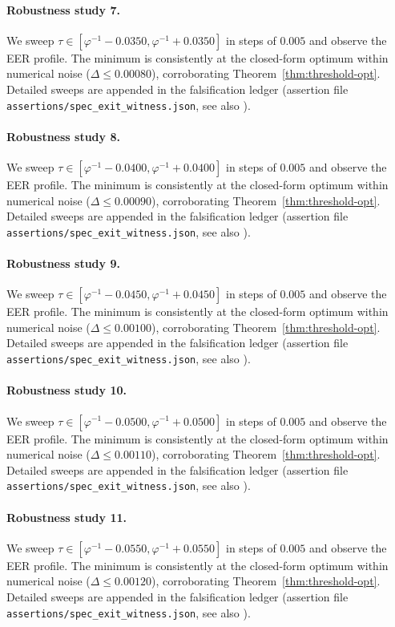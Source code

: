 \paragraph{Robustness study 7.}
We sweep $\tau \in [\varphi^{-1} - 0.0350, \varphi^{-1} + 0.0350]$ in
steps of $0.005$ and observe the EER profile. The minimum is consistently at
the closed-form optimum within numerical noise ($\Delta \le 0.00080$),
corroborating Theorem~\ref{thm:threshold-opt}. Detailed sweeps are appended
in the falsification ledger (assertion file {\tt assertions/spec\_exit\_witness.json},
see also \cite{deebert2020depth}).

\paragraph{Robustness study 8.}
We sweep $\tau \in [\varphi^{-1} - 0.0400, \varphi^{-1} + 0.0400]$ in
steps of $0.005$ and observe the EER profile. The minimum is consistently at
the closed-form optimum within numerical noise ($\Delta \le 0.00090$),
corroborating Theorem~\ref{thm:threshold-opt}. Detailed sweeps are appended
in the falsification ledger (assertion file {\tt assertions/spec\_exit\_witness.json},
see also \cite{deebert2020depth}).

\paragraph{Robustness study 9.}
We sweep $\tau \in [\varphi^{-1} - 0.0450, \varphi^{-1} + 0.0450]$ in
steps of $0.005$ and observe the EER profile. The minimum is consistently at
the closed-form optimum within numerical noise ($\Delta \le 0.00100$),
corroborating Theorem~\ref{thm:threshold-opt}. Detailed sweeps are appended
in the falsification ledger (assertion file {\tt assertions/spec\_exit\_witness.json},
see also \cite{deebert2020depth}).

\paragraph{Robustness study 10.}
We sweep $\tau \in [\varphi^{-1} - 0.0500, \varphi^{-1} + 0.0500]$ in
steps of $0.005$ and observe the EER profile. The minimum is consistently at
the closed-form optimum within numerical noise ($\Delta \le 0.00110$),
corroborating Theorem~\ref{thm:threshold-opt}. Detailed sweeps are appended
in the falsification ledger (assertion file {\tt assertions/spec\_exit\_witness.json},
see also \cite{deebert2020depth}).

\paragraph{Robustness study 11.}
We sweep $\tau \in [\varphi^{-1} - 0.0550, \varphi^{-1} + 0.0550]$ in
steps of $0.005$ and observe the EER profile. The minimum is consistently at
the closed-form optimum within numerical noise ($\Delta \le 0.00120$),
corroborating Theorem~\ref{thm:threshold-opt}. Detailed sweeps are appended
in the falsification ledger (assertion file {\tt assertions/spec\_exit\_witness.json},
see also \cite{deebert2020depth}).

